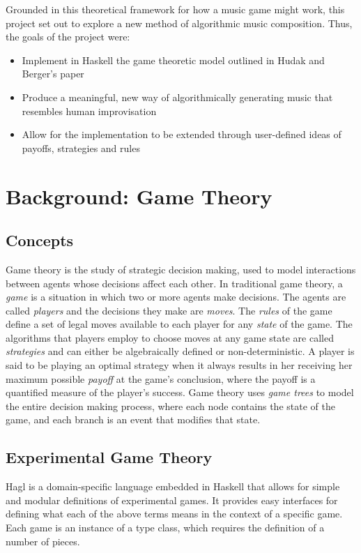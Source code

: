 \documentclass{article}
\begin{document}
Grounded in this theoretical framework for how a music game might
work, this project set out to explore a new method of algorithmic music
composition. Thus, the goals of the project were:

\begin{itemize}
\itemsep1pt\parskip0pt
\item
  Implement in Haskell the game theoretic model outlined in Hudak and Berger's
  paper
\item
  Produce a meaningful, new way of algorithmically generating music that
  resembles human improvisation
\item
  Allow for the implementation to be extended through user-defined ideas
  of payoffs, strategies and rules
\end{itemize}

\section{Background: Game Theory}

\subsection{Concepts}
Game theory is the study of strategic decision making, used to model
interactions between agents whose decisions affect each other. In
traditional game theory, a \emph{game} is a situation in which two or
more agents make decisions. The agents are called \emph{players} and the
decisions they make are \emph{moves}. The \emph{rules} of the game
define a set of legal moves available to each player for any
\emph{state} of the game. The algorithms that players employ to choose
moves at any game state are called \emph{strategies} and can either be
algebraically defined or non-deterministic. A player is said to be
playing an optimal strategy when it always results in her receiving her
maximum possible \emph{payoff} at the game's conclusion, where the
payoff is a quantified measure of the player's success. Game theory uses
\emph{game trees} to model the entire decision making process, where
each node contains the state of the game, and each branch is an event
that modifies that state.

\subsection{Experimental Game Theory}
Hagl is a domain-specific language embedded in Haskell that allows for
simple and modular definitions of experimental games.\cite{gametheorythesis, gametheory}  It provides easy interfaces for
defining what each of the above terms means in the context of a specific
game. Each game is an instance of a type class, which requires the
definition of a number of pieces.
\end{document}
